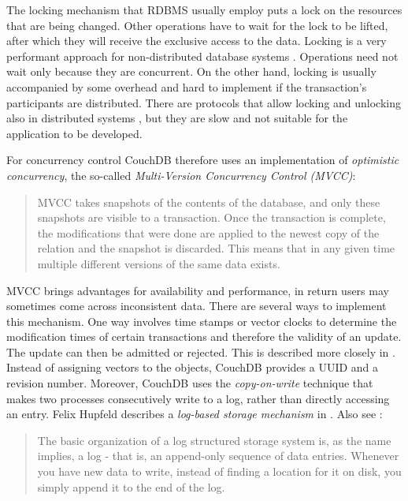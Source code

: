 The locking mechanism that RDBMS usually employ puts a lock on the resources that are being changed. Other operations have to wait for the lock to be lifted, after which they will receive the exclusive access to the data. Locking is a very performant approach for non-distributed database systems . Operations need not wait only because they are concurrent. On the other hand, locking is usually accompanied by some overhead and hard to implement if the transaction's participants are distributed. There are protocols that allow locking and unlocking also in distributed systems , but they are slow and not suitable for the application to be developed.

For concurrency control CouchDB therefore uses an implementation of \textit{optimistic concurrency}, the so-called \textit{Multi-Version Concurrency Control (MVCC)}:

\begin{quote}
MVCC takes snapshots of the contents of the database, and only these snapshots are visible to a transaction. Once the transaction is complete, the modifications that were done are applied to the newest copy of the relation and the snapshot is discarded. This means that in any given time multiple different versions of the same data exists. 
\end{quote}

MVCC brings advantages for availability and performance, in return users may sometimes come across inconsistent data. There are several ways to implement this mechanism. One way involves time stamps or vector clocks to determine the modification times of certain transactions and therefore the validity of an update. The update can then be admitted or rejected. This is described more closely in . Instead of assigning vectors to the objects, CouchDB provides a UUID and a revision number. Moreover, CouchDB uses the \textit{copy-on-write} technique that makes two processes consecutively write to a log, rather than directly accessing an entry. Felix Hupfeld describes a \textit{log-based storage mechanism} in . Also see \cite{logstructuredstorage}:

\begin{quote}
The basic organization of a log structured storage system is, as the name implies, a log - that is, an append-only sequence of data entries. Whenever you have new data to write, instead of finding a location for it on disk, you simply append it to the end of the log.
\end{quote}

